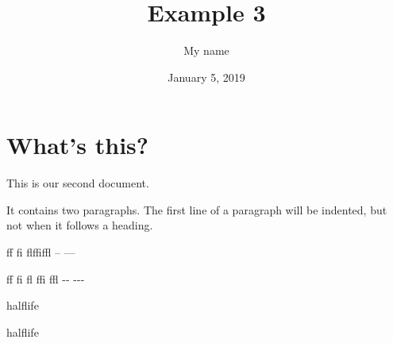 \documentclass[a4paper,11pt]{article}
\begin{document}
\title{Example 3}
\author{My name}
\date{January 5, 2019}
\maketitle
\section{What's this?}
This   is   our second document.

It contains two paragraphs. The first line of a paragraph will be
indented, but not when it follows a heading.

ff fi flffiffl -- ---

f\/f f\/i f\/l f\/f\/i f\/f\/l -\/- -\/-\/-

halflife

half\/life


\end{document}
